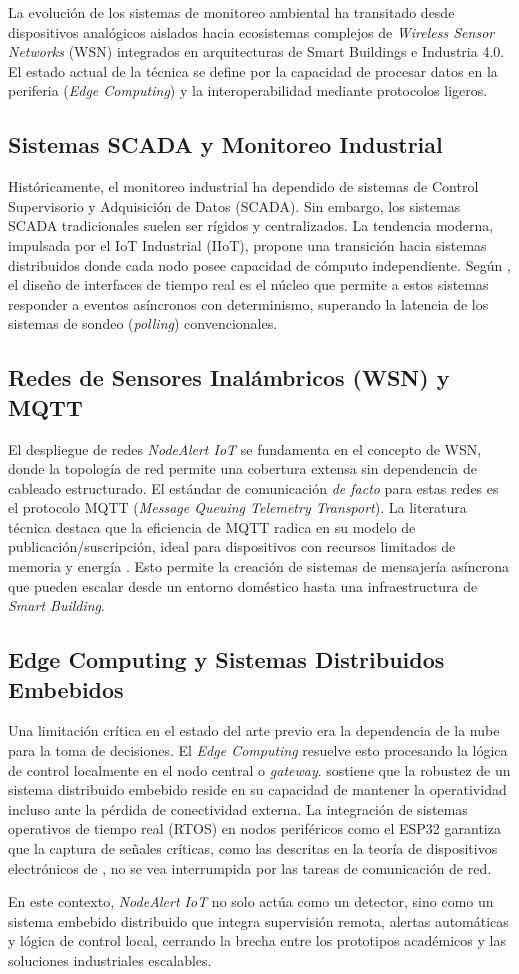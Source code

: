 La evolución de los sistemas de monitoreo ambiental ha transitado desde dispositivos analógicos aislados hacia ecosistemas complejos de \textit{Wireless Sensor Networks} (WSN) integrados en arquitecturas de Smart Buildings e Industria 4.0. El estado actual de la técnica se define por la capacidad de procesar datos en la periferia (\textit{Edge Computing}) y la interoperabilidad mediante protocolos ligeros.

\subsection{Sistemas SCADA y Monitoreo Industrial}
Históricamente, el monitoreo industrial ha dependido de sistemas de Control Supervisorio y Adquisición de Datos (SCADA). Sin embargo, los sistemas SCADA tradicionales suelen ser rígidos y centralizados. La tendencia moderna, impulsada por el IoT Industrial (IIoT), propone una transición hacia sistemas distribuidos donde cada nodo posee capacidad de cómputo independiente. Según \citet{valvano2014volume2}, el diseño de interfaces de tiempo real es el núcleo que permite a estos sistemas responder a eventos asíncronos con determinismo, superando la latencia de los sistemas de sondeo (\textit{polling}) convencionales.

\subsection{Redes de Sensores Inalámbricos (WSN) y MQTT}
El despliegue de redes \textit{NodeAlert IoT } se fundamenta en el concepto de WSN, donde la topología de red permite una cobertura extensa sin dependencia de cableado estructurado. El estándar de comunicación \textit{de facto} para estas redes es el protocolo MQTT (\textit{Message Queuing Telemetry Transport}). La literatura técnica destaca que la eficiencia de MQTT radica en su modelo de publicación/suscripción, ideal para dispositivos con recursos limitados de memoria y energía \citep{mazidi2014}. Esto permite la creación de sistemas de mensajería asíncrona que pueden escalar desde un entorno doméstico hasta una infraestructura de \textit{Smart Building}.

\subsection{Edge Computing y Sistemas Distribuidos Embebidos}
Una limitación crítica en el estado del arte previo era la dependencia de la nube para la toma de decisiones. El \textit{Edge Computing} resuelve esto procesando la lógica de control localmente en el nodo central o \textit{gateway}. \citet{valvano2014volume1} sostiene que la robustez de un sistema distribuido embebido reside en su capacidad de mantener la operatividad incluso ante la pérdida de conectividad externa. La integración de sistemas operativos de tiempo real (RTOS) en nodos periféricos como el ESP32 garantiza que la captura de señales críticas, como las descritas en la teoría de dispositivos electrónicos de \citet{boylestad2009}, no se vea interrumpida por las tareas de comunicación de red.

En este contexto, \textit{NodeAlert IoT} no solo actúa como un detector, sino como un sistema embebido distribuido que integra supervisión remota, alertas automáticas y lógica de control local, cerrando la brecha entre los prototipos académicos y las soluciones industriales escalables.